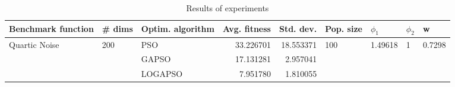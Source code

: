 \begin{table}
\centering
\caption{Results of experiments}
\begin{tabular}{lllrrllll}
\toprule
            Benchmark function &              \# dims & Optim. algorithm &  Avg. fitness &  Std. dev. &            Pop. size &               $\phi_{1}$ &         $\phi_{2}$ &                       w \\
\midrule
\multirow{3}{*}{Quartic Noise} & \multirow{3}{*}{200} &              PSO &     33.226701 &  18.553371 & \multirow{3}{*}{100} & \multirow{3}{*}{1.49618} & \multirow{3}{*}{1} & \multirow{3}{*}{0.7298} \\
                               &                      &            GAPSO &     17.131281 &   2.957041 &                      &                          &                    &                         \\
                               &                      &          LOGAPSO &      7.951780 &   1.810055 &                      &                          &                    &                         \\
\bottomrule
\end{tabular}
\end{table}
